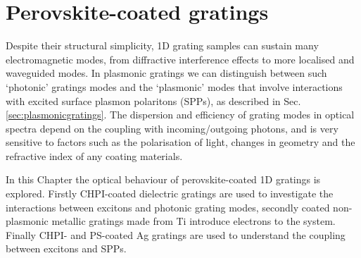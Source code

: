 
\chapter{Perovskite-coated gratings}

\graphicspath{{Chapter7/Figures/}}

Despite their structural simplicity, 1D grating samples can sustain many electromagnetic modes, from diffractive interference effects to more localised and waveguided modes. In plasmonic gratings we can distinguish between such `photonic' gratings modes and the `plasmonic' modes that involve interactions with excited surface plasmon polaritons (SPPs), as described in Sec.\,\ref{sec:plasmonicgratings}. The dispersion and efficiency of grating modes in optical spectra depend on the coupling with incoming/outgoing photons, and is very sensitive to factors such as the polarisation of light, changes in geometry and the refractive index of any coating materials.

In this Chapter the optical behaviour of perovskite-coated 1D gratings is explored. Firstly CHPI-coated dielectric gratings are used to investigate the interactions between excitons and photonic grating modes, secondly coated non-plasmonic metallic gratings made from Ti introduce electrons to the system. Finally CHPI- and PS-coated Ag gratings are used to understand the coupling between excitons and SPPs. 

